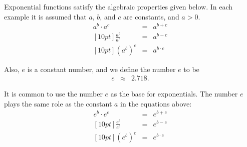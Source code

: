 \vfill

Exponential functions satisfy the algebraic properties given below. In
each example it is assumed that $a$, $b$, and $c$ are constants, and
$a>0$.
\begin{eqnarray}
  a^b \cdot a^c & = & a^{b+c}   \\ [10pt]
  \frac{a^b}{a^c} & = & a^{b-c} \\  [10pt]
  \left( a^b \right)^c & = & a^{b\cdot c}
\end{eqnarray}

Also, $e$ is a constant number, and we define the number $e$ to be
\begin{eqnarray*}
  e & \approx & 2.718.
\end{eqnarray*}

It is common to use the number $e$ as the base for exponentials. The
number $e$ plays the same role as the constant $a$ in the equations
above:
\begin{eqnarray}
  e^b \cdot e^c & = & e^{b+c}   \\ [10pt]
  \frac{e^b}{e^c} & = & e^{b-c} \\  [10pt]
  \left( e^b \right)^c & = & e^{b\cdot c}
\end{eqnarray}



